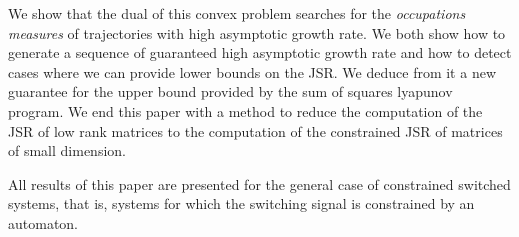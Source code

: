 

We show that the dual of this convex problem searches
for the \emph{occupations measures} of trajectories with high asymptotic growth
rate.
We both show how to generate a sequence of guaranteed high asymptotic growth rate and how to detect cases where we can provide lower bounds on the JSR.
We deduce from it a new guarantee for the upper bound provided by the sum of squares lyapunov program.
We end this paper with a method to reduce the computation of the JSR of
low rank matrices to the computation of the constrained JSR of matrices
of small dimension.

All results of this paper are presented for the general case of constrained switched systems,
that is, systems for which the switching signal is constrained by an automaton.
